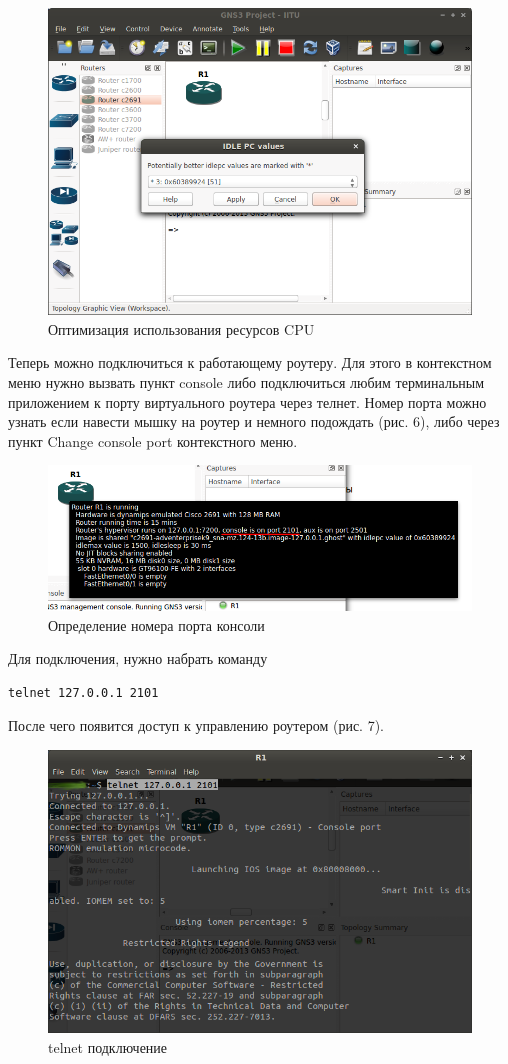 \begin{figure}[h!]
\centering
\includegraphics[scale=0.6]{res/pic005}
\caption{Оптимизация использования ресурсов CPU}
\end{figure}

Теперь можно подключиться к работающему роутеру. Для этого в контекстном меню нужно вызвать пункт console либо подключиться любим терминальным приложением к порту виртуального роутера через телнет. Номер порта можно узнать если навести мышку на роутер и немного подождать (рис. 6), либо через пункт Change console port контекстного меню.

\begin{figure}[h!]
\centering
\includegraphics[scale=0.6]{res/pic006}
\caption{Определение номера порта консоли}
\end{figure}

Для подключения, нужно набрать команду
\begin{Verbatim}[frame=single]
telnet 127.0.0.1 2101
\end{Verbatim}

После чего появится доступ к управлению роутером (рис. 7).

\begin{figure}[h!]
\centering
\includegraphics[scale=0.65]{res/pic007}
\caption{telnet подключение}
\end{figure}
